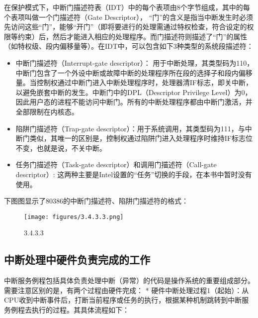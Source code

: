 在保护模式下，中断门描述符表（IDT）中的每个表项由8个字节组成，其中的每个表项叫做一个门描述符（Gate
Descriptor），
``门''的含义是指当中断发生时必须先访问这些``门''，能够``开门''（即将要进行的处理需通过特权检查，符合设定的权限等约束）后，然后才能进入相应的处理程序。而门描述符则描述了``门''的属性（如特权级、段内偏移量等）。在IDT中，可以包含如下3种类型的系统段描述符：

\begin{itemize}
\item
  中断门描述符（Interrupt-gate descriptor）：
  用于中断处理，其类型码为110，中断门包含了一个外设中断或故障中断的处理程序所在段的选择子和段内偏移量。当控制权通过中断门进入中断处理程序时，处理器清IF标志，即关中断，以避免嵌套中断的发生。中断门中的DPL（Descriptor
  Privilege
  Level）为0，因此用户态的进程不能访问中断门。所有的中断处理程序都由中断门激活，并全部限制在内核态。
\item
  陷阱门描述符（Trap-gate
  descriptor）：用于系统调用，其类型码为111，与中断门类似，其唯一的区别是，控制权通过陷阱门进入处理程序时维持IF标志位不变，也就是说，不关中断。
\item
  任务门描述符（Task-gate descriptor）和调用门描述符（Call-gate
  descriptor）:
  这两种主要是Intel设置的``任务''切换的手段，在本书中暂时没有使用。
\end{itemize}

下图图显示了80386的中断门描述符、陷阱门描述符的格式：

\begin{figure}[htbp]
\centering
\texttt{[image: figures/3.4.3.3.png]}
\caption{3.4.3.3}
\end{figure}

\subsection{中断处理中硬件负责完成的工作}\label{ux4e2dux65adux5904ux7406ux4e2dux786cux4ef6ux8d1fux8d23ux5b8cux6210ux7684ux5de5ux4f5c}

中断服务例程包括具体负责处理中断（异常）的代码是操作系统的重要组成部分。需要注意区别的是，有两个过程由硬件完成：
*
硬件中断处理过程1（起始）：从CPU收到中断事件后，打断当前程序或任务的执行，根据某种机制跳转到中断服务例程去执行的过程。其具体流程如下：

